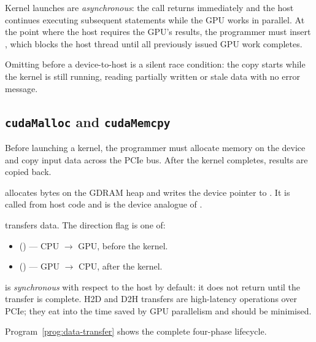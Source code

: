 Kernel launches are \emph{asynchronous}: the  call
returns immediately and the host continues executing subsequent statements
while the GPU works in parallel. At the point where the host requires the
GPU's results, the programmer must insert ,
which blocks the host thread until all previously issued GPU work completes.

\begin{pppitfall}
Omitting  before a device-to-host
 is a silent race condition: the copy starts while the
kernel is still running, reading partially written or stale data with no
error message.
\end{pppitfall}

\subsection{\texttt{cudaMalloc} and \texttt{cudaMemcpy}}
\label{ssec:malloc-memcpy}

Before launching a kernel, the programmer must allocate memory on the device
and copy input data across the PCIe bus. After the kernel completes, results
are copied back.

 allocates  bytes on the
GDRAM heap and writes the device pointer to . It is called from
host code and is the device analogue of .

 transfers data. The
direction flag is one of:
\begin{itemize}
  \item {} () --- CPU $\to$ GPU,
    before the kernel.
  \item {} () --- GPU $\to$ CPU,
    after the kernel.
\end{itemize}

 is \emph{synchronous} with respect to the host by
default: it does not return until the transfer is complete. H2D and D2H
transfers are high-latency operations over PCIe; they eat into the time saved
by GPU parallelism and should be minimised.

Program~\ref{prog:data-transfer} shows the complete four-phase lifecycle.

